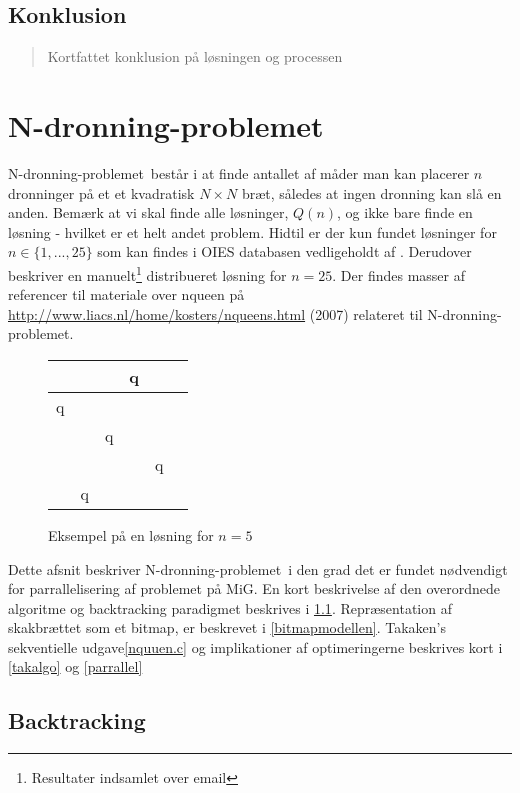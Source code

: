 \documentclass[pdf,draft,a4paper,11pt]{article}
\newcommand{\mig}{MiG}
\newcommand{\nq}{N-dronning-problemet}
\def\chs#1{{\chessfont#1}}
\begin{document}
\subsection*{Konklusion}\label{konklusion}
\begin{verse}
	Kortfattet konklusion på løsningen og processen
\end{verse}

\section{\nq}\label{nqueenproblemet}

\nq\ består i at finde antallet af måder man kan placerer $n$ dronninger på et et kvadratisk $N \times N$ bræt, således at ingen dronning kan slå en anden. Bemærk at vi skal finde alle løsninger, $Q(n)$, og ikke bare finde en løsning - hvilket er et helt andet problem. Hidtil er der kun fundet løsninger for $n \in \{1,...,25\}$ som kan findes i OIES databasen vedligeholdt af \citep{sekvenser}. Derudover beskriver \cite{etsi} en manuelt\footnote{Resultater indsamlet over email} distribueret løsning for $n=25$. Der findes masser af referencer til materiale over nqueen på \url{http://www.liacs.nl/home/kosters/nqueens.html} (2007) relateret til \nq. 

\begin{figure}
\begin{center}
\begin{tabular}{|c|c|c|c|c|c}
\hline	 &  & &   \chs{q} & \\
\hline	\chs{q} & &  &  & \\
\hline	 & & \chs{q} &  &  \\
\hline	 &  &  & & \chs{q} \\
\hline	 & \chs{q} & &  &  \\
\hline
\end{tabular}
\end{center}
\caption{Eksempel på en løsning for $n=5$}
\label{fig:nq5eks}
\end{figure}

Dette afsnit beskriver \nq\ i den grad det er fundet nødvendigt for parrallelisering af problemet på \mig. En kort beskrivelse af den overordnede algoritme og backtracking paradigmet beskrives i \ref{backtracking}. Repræsentation af skakbrættet som et bitmap, er beskrevet i \ref{bitmapmodellen}. Takaken's sekventielle udgave\ref{nquuen.c} og implikationer af optimeringerne beskrives kort i \ref{takalgo} og \ref{parrallel}


\subsection{Backtracking}\label{backtracking}
\end{document}

